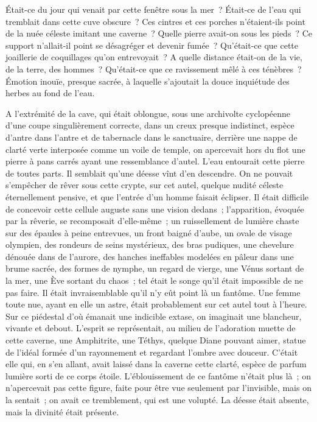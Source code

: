 \documentclass[french,twoside]{book} %
\begin{document}
Était-ce du jour qui venait par cette fenêtre sous la mer ? Était-ce de l’eau qui tremblait dans cette cuve obscure ? Ces cintres et ces porches n’étaient-ils point de la nuée céleste imitant une caverne ? Quelle pierre avait-on sous les pieds ? Ce support n’allait-il point se désagréger et devenir fumée ? Qu’était-ce que cette joaillerie de coquillages qu’on entrevoyait ? A quelle distance était-on de la vie, de la terre, des hommes ? Qu’était-ce que ce ravissement mêlé à ces ténèbres ? Émotion inouïe, presque sacrée, à laquelle s’ajoutait la douce inquiétude des herbes au fond de l’eau.\par
A l’extrémité de la cave, qui était oblongue, sous une archivolte cyclopéenne d’une coupe singulièrement correcte, dans un creux presque indistinct, espèce d’antre dans l’antre et de tabernacle dans le sanctuaire, derrière une nappe de clarté verte interposée comme un voile de temple, on apercevait hors du flot une pierre à pans carrés ayant une ressemblance d’autel. L’eau entourait cette pierre de toutes parts. Il semblait qu’une déesse vînt d’en descendre. On ne pouvait s’empêcher de rêver sous cette crypte, sur cet autel, quelque nudité céleste éternellement pensive, et que l’entrée d’un homme faisait éclipser. Il était difficile de  concevoir cette cellule auguste sans une vision dedans ; l’apparition, évoquée par la rêverie, se recomposait d’elle-même ; un ruissellement de lumière chaste sur des épaules à peine entrevues, un front baigné d’aube, un ovale de visage olympien, des rondeurs de seins mystérieux, des bras pudiques, une chevelure dénouée dans de l’aurore, des hanches ineffables modelées en pâleur dans une brume sacrée, des formes de nymphe, un regard de vierge, une Vénus sortant de la mer, une Ève sortant du chaos ; tel était le songe qu’il était impossible de ne pas faire. Il était invraisemblable qu’il n’y eût point là un fantôme. Une femme toute nue, ayant en elle un astre, était probablement sur cet autel tout à l’heure. Sur ce piédestal d’où émanait une indicible extase, on imaginait une blancheur, vivante et debout. L’esprit se représentait, au milieu de l’adoration muette de cette caverne, une Amphitrite, une Téthys, quelque Diane pouvant aimer, statue de l’idéal formée d’un rayonnement et regardant l’ombre avec douceur. C’était elle qui, en s’en allant, avait laissé dans la caverne cette clarté, espèce de parfum lumière sorti de ce corps étoile. L’éblouissement de ce fantôme n’était plus là ; on n’apercevait pas cette figure, faite pour être vue seulement par l’invisible, mais on la sentait ; on avait ce tremblement, qui est une volupté. La déesse était absente, mais la divinité était présente.\par
\end{document}
